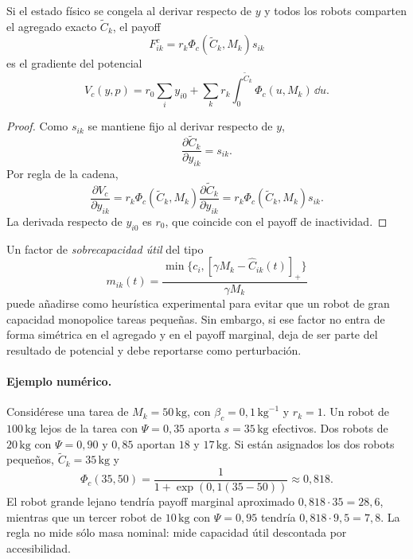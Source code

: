 \begin{proposicion}
\label{prop:potencial_capacidad_efectiva}
Si el estado físico se congela al derivar respecto de $y$ y todos los robots comparten
el agregado exacto $\widetilde C_k$, el payoff
\[
  F^c_{ik}=r_k\Phi_c(\widetilde C_k,M_k)s_{ik}
\]
es el gradiente del potencial
\begin{equation}
  V_c(y,p)=
  r_0\sum_i y_{i0}
  +
  \sum_k r_k
  \int_0^{\widetilde C_k}\Phi_c(u,M_k)\,\dd u .
  \label{eq:potencial_capacidad_efectiva}
\end{equation}
\end{proposicion}

\begin{proof}
Como $s_{ik}$ se mantiene fijo al derivar respecto de $y$,
\[
  \frac{\partial \widetilde C_k}{\partial y_{ik}}=s_{ik}.
\]
Por regla de la cadena,
\[
  \frac{\partial V_c}{\partial y_{ik}}
  =
  r_k\Phi_c(\widetilde C_k,M_k)
  \frac{\partial \widetilde C_k}{\partial y_{ik}}
  =
  r_k\Phi_c(\widetilde C_k,M_k)s_{ik}.
\]
La derivada respecto de $y_{i0}$ es $r_0$, que coincide con el payoff de inactividad.
\end{proof}

Un factor de \emph{sobrecapacidad útil} del tipo
\[
  m_{ik}(t)=
  \frac{\min\{c_i,[\gamma M_k-\widehat C_{ik}(t)]_+\}}{\gamma M_k}
\]
puede añadirse como heurística experimental para evitar que un robot de gran capacidad
monopolice tareas pequeñas. Sin embargo, si ese factor no entra de forma simétrica en
el agregado y en el payoff marginal, deja de ser parte del resultado de potencial y debe
reportarse como perturbación.

\paragraph{Ejemplo numérico.}
Considérese una tarea de $M_k=50\,\mathrm{kg}$, con $\beta_c=0{,}1\,\mathrm{kg}^{-1}$ y
$r_k=1$. Un robot de $100\,\mathrm{kg}$ lejos de la tarea con $\Psi=0{,}35$ aporta
$s=35\,\mathrm{kg}$ efectivos. Dos robots de $20\,\mathrm{kg}$ con $\Psi=0{,}90$ y
$0{,}85$ aportan $18$ y $17\,\mathrm{kg}$. Si están asignados los dos robots pequeños,
$\widetilde C_k=35\,\mathrm{kg}$ y
\[
  \Phi_c(35,50)=\frac{1}{1+\exp(0{,}1(35-50))}\approx0{,}818.
\]
El robot grande lejano tendría payoff marginal aproximado $0{,}818\cdot35=28{,}6$,
mientras que un tercer robot de $10\,\mathrm{kg}$ con $\Psi=0{,}95$ tendría
$0{,}818\cdot9{,}5=7{,}8$. La regla no mide sólo masa nominal: mide capacidad útil
descontada por accesibilidad.

